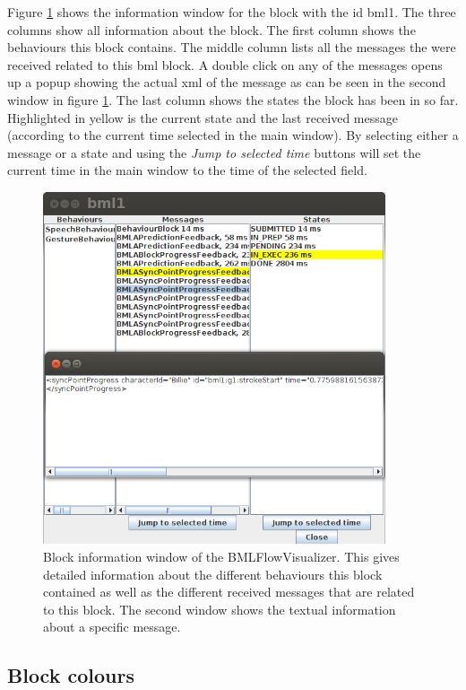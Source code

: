 \documentclass[12pt,a4paper]{article}
\begin{document}
Figure \ref{fig:info} shows the information window for the block with the id bml1. The three columns show all information about the block. The first column shows the behaviours this block contains. The middle column lists all the messages the were received related to this bml block. A double click on any of the messages opens up a popup showing the actual xml of the message as can be seen in the second window in figure \ref{fig:info}. The last column shows the states the block has been in so far. Highlighted in yellow is the current state and the last received message (according to the current time selected in the main window). By selecting either a message or a state and using the \textit{Jump to selected time} buttons will set the current time in the main window to the time of the selected field.

\begin{figure}[!htb]
\centering
 \includegraphics[width=0.9\textwidth]{images/bmlFlowBlockInfo.png}
 \caption{Block information window of the BMLFlowVisualizer. This gives detailed information about the different behaviours this block contained as well as the different received messages that are related to this block. The second window shows the textual information about a specific message.}
 \label{fig:info}
\end{figure}

\subsection{Block colours \label{sec:colours}}
\end{document}
